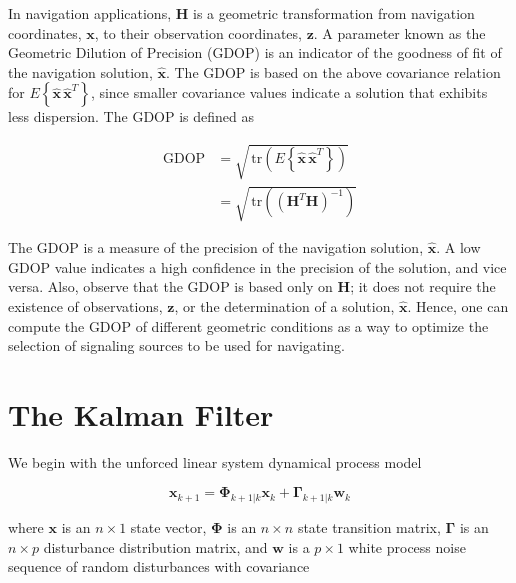 \documentclass[12pt]{article}
\begin{document}
In navigation applications, $\mathbf{H}$ is a geometric transformation from navigation
coordinates, $\mathbf{x}$, to their observation coordinates, $\mathbf{z}$. A parameter
known as the Geometric Dilution of Precision (GDOP) is an indicator of the goodness of
fit of the navigation solution, $\hat{\mathbf{x}}$. The GDOP is based on the above
covariance relation for $E \left\{ \hat{\mathbf{x}} \, \hat{\mathbf{x}}^T \right\}$,
since smaller covariance values indicate a solution that exhibits less dispersion. The
GDOP is defined as

\begin{equation*}
    \begin{aligned}
        \mathrm{GDOP} &= \sqrt{ \, \mathrm{tr} \left( E \left\{ \hat{\mathbf{x}} \, \hat{\mathbf{x}}^T \right\} \right) } \\
                      &= \sqrt{ \, \mathrm{tr} \left( \left( \mathbf{H}^T \mathbf{H} \right)^{-1} \right) }
    \end{aligned}
\end{equation*}

The GDOP is a measure of the precision of the navigation solution, $\hat{\mathbf{x}}$.
A low GDOP value indicates a high confidence in the precision of the solution, and vice
versa. Also, observe that the GDOP is based only on $\mathbf{H}$; it does not require
the existence of observations, $\mathbf{z}$, or the determination of a solution,
$\hat{\mathbf{x}}$. Hence, one can compute the GDOP of different geometric conditions
as a way to optimize the selection of signaling sources to be used for navigating.


\clearpage



\section{The Kalman Filter}

We begin with the unforced linear system dynamical process model

\begin{equation}
    \mathbf{x}_{k+1} = \mathbf{\Phi}_{k+1|k} \mathbf{x}_k + \mathbf{\Gamma}_{k+1|k} \mathbf{w}_k
    \label{eq:unforced-linear-system-dynamical-model}
\end{equation}

where $\mathbf{x}$ is an $n \times 1$ state vector,
$\mathbf{\Phi}$ is an $n \times n$ state transition matrix,
$\mathbf{\Gamma}$ is an $n \times p$ disturbance distribution matrix,
and $\mathbf{w}$ is a $p \times 1$ white process noise sequence of random disturbances with covariance
\end{document}
